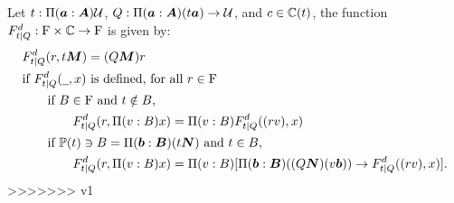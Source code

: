 \begin{definition}
  Let $t : \Pi(\boldsymbol{a} : \boldsymbol{A}) \mathcal{U}$, $Q : \Pi(\boldsymbol{a} : \boldsymbol{A}) (t \boldsymbol{a}) \rightarrow \mathcal{U}$, and $c \in \mathbb{C}(t)$, the function $F^{d}_{t|Q}:\mathrm{F} \times \mathbb{C} \to \mathrm{F}$ is given by:
  \begin{align*}
    & F^{d}_{t|Q} (r, t \boldsymbol{M}) = (Q \boldsymbol{M})r \\
    & \text{if } F^{d}_{t|Q} (\mathord{\underline{\hspace{0.5em}}}, x) \text{ is defined, for all } r \in \mathrm{F} \\
    & \qquad \text{if } B \in \mathrm{F}\text{ and } t \notin B, \\
    & \qquad \qquad F^{d}_{t|Q} (r, \Pi(v : B) x) = \Pi(v : B) F^{d}_{t|Q}((r v), x) \\
    & \qquad  \text{if } \mathbb{P}(t) \ni B = \Pi(\boldsymbol{b}: \boldsymbol{B})(t \boldsymbol{N}) \text{ and } t \in B,\\ 
    & \qquad \qquad F^{d}_{t|Q}(r, \Pi(v : B) x) = \Pi(v : B)[\Pi(\boldsymbol{b} : \boldsymbol{B})((Q \boldsymbol{N}) (v \boldsymbol{b})) \rightarrow  F^{d}_{t|Q}((r v), x) ].
  \end{align*}
>>>>>>> v1
\end{definition}







